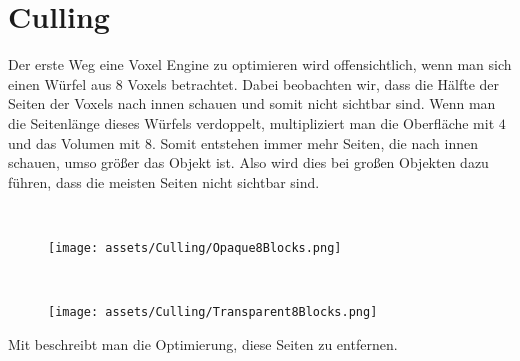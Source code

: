 \newcommand{\minipagespace}[1]{
	\begin{minipage}[c]{#1\textwidth}
		\ 
	\end{minipage}
}

\section{Culling}

Der erste Weg eine Voxel Engine zu optimieren wird
offensichtlich, wenn man sich einen Würfel aus $8$
Voxels betrachtet. Dabei beobachten wir, dass
die Hälfte der Seiten der Voxels nach innen schauen
und somit nicht sichtbar sind. Wenn man die
Seitenlänge dieses Würfels verdoppelt, multipliziert
man die Oberfläche mit $4$ und das Volumen mit $8$.
Somit entstehen immer mehr Seiten, die nach innen
schauen, umso größer das Objekt ist. Also wird
dies bei großen Objekten dazu führen, dass die
meisten Seiten nicht sichtbar sind.

\begin{center}
\begin{figure}[ht]
	\minipagespace{0.04}
	\begin{minipage}[c]{0.4\textwidth}
		\begin{center}
\texttt{[image: assets/Culling/Opaque8Blocks.png]}
		\end{center}
	\end{minipage}
	\minipagespace{0.09}
	\begin{minipage}[c]{0.4\textwidth}
		\begin{center}
\texttt{[image: assets/Culling/Transparent8Blocks.png]}
		\end{center}
	\end{minipage}\hfill
\end{figure}
\end{center}

Mit  beschreibt man die Optimierung,
diese Seiten zu entfernen.

{  }

{  }
